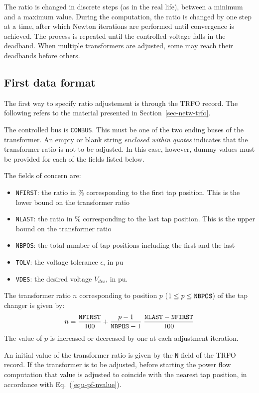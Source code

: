 The ratio is changed in discrete steps (as in the real life), between a minimum and a maximum value. During the computation, the ratio is changed by one step at a time, after which Newton iterations are performed until convergence is achieved. The process is repeated until the controlled voltage falls in the deadband. When multiple transformers are adjusted, some may reach their deadbands before others.

\subsection{First data format}

The first way to specify ratio adjustement is through the TRFO record. The following refers to the material  presented in Section~\ref{sec-netw-trfo}.

The controlled bus is {\tt CONBUS}. This must be one of the two ending buses of the transformer. An empty or blank string {\sl \large enclosed within quotes} indicates that the transformer ratio is not to be adjusted. In this case, however, dummy values must be provided for each of the fields listed below.

The fields of concern are:

\begin{itemize}
\item {\tt NFIRST}: the ratio in \% corresponding to the first tap position. This is the lower bound on the transformer ratio
\item {\tt NLAST}: the ratio in \% corresponding to the last tap position. This is the upper bound on the transformer ratio
\item {\tt NBPOS}: the total number of tap positions including the first and the last
\item {\tt TOLV}: the voltage tolerance $\epsilon$, in pu
\item {\tt VDES}: the desired voltage $V_{des}$, in pu.
\end{itemize}

The transformer ratio $n$ corresponding to position $p$ ($1 \le p \le {\tt NBPOS}$) of the tap changer is given by:
\begin{equation}\label{equ-pf-nvalue}
n = \frac{{\tt NFIRST}}{100} + \frac{p-1}{{\tt NBPOS}-1} \; \frac{{\tt NLAST} - {\tt NFIRST}}{100}
\end{equation}
The value of $p$ is increased or decreased by one at each adjustment iteration.

An initial value of the transformer ratio is given by the {\tt N} field of the TRFO record. If the transformer is to be adjusted, before starting the power flow computation that value is adjusted to coincide with the nearest tap position, in accordance with Eq.~(\ref{equ-pf-nvalue}).

